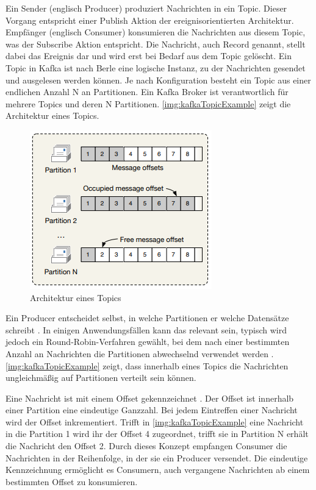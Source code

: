 \documentclass[a4paper,titlepage,halfparskip,12pt]{scrreprt}
\begin{document}
\begin{onehalfspacing}
Ein Sender (englisch Producer) produziert Nachrichten in ein Topic. Dieser Vorgang entspricht einer Publish Aktion der ereignisorientierten Architektur. Empfänger (englisch Consumer) konsumieren die Nachrichten aus diesem Topic, was der Subscribe Aktion entspricht. Die Nachricht, auch Record genannt, stellt dabei das Ereignis dar und wird erst bei Bedarf aus dem Topic gelöscht. Ein Topic in Kafka ist nach Berle \cite{berleKafkaOverview} eine logische Instanz, zu der Nachrichten gesendet und ausgelesen werden können. Je nach Konfiguration besteht ein Topic aus einer endlichen Anzahl N an Partitionen. Ein Kafka Broker ist verantwortlich für mehrere Topics und deren N Partitionen. \autoref{img:kafkaTopicExample} zeigt die Architektur eines Topics.

\begin{figure}[h]
	\centering
	\includegraphics[width=.55\textwidth]{images/kafkaTopicExample}
	\caption{Architektur eines Topics \cite{nannoniDissKafka}}
	\label{img:kafkaTopicExample}
\end{figure}

Ein Producer entscheidet selbst, in welche Partitionen er welche Datensätze schreibt \cite{berleKafkaOverview}. In einigen Anwendungsfällen kann das relevant sein, typisch wird jedoch ein Round-Robin-Verfahren gewählt, bei dem nach einer bestimmten Anzahl an Nachrichten die Partitionen abwechselnd verwendet werden \cite{berleKafkaOverview}. \autoref{img:kafkaTopicExample} zeigt, dass innerhalb eines Topics die Nachrichten ungleichmäßig auf Partitionen verteilt sein können.

Eine Nachricht ist mit einem Offset gekennzeichnet \cite{berleKafkaOverview, nannoniDissKafka}. Der Offset ist innerhalb einer Partition eine eindeutige Ganzzahl. Bei jedem Eintreffen einer Nachricht wird der Offset inkrementiert. Trifft in \autoref{img:kafkaTopicExample} eine Nachricht in die Partition 1 wird ihr der Offset 4 zugeordnet, trifft sie in Partition N erhält die Nachricht den Offset 2. Durch dieses Konzept empfangen Consumer die Nachrichten in der Reihenfolge, in der sie ein Producer versendet. Die eindeutige Kennzeichnung ermöglicht es Consumern, auch vergangene Nachrichten ab einem bestimmten Offset zu konsumieren.\cite{nannoniDissKafka}


\end{onehalfspacing}
\end{document}
